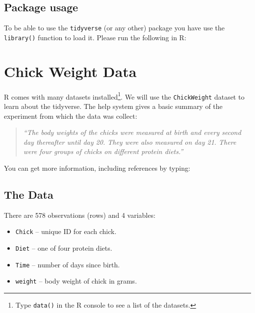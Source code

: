 \documentclass[a4paper,9pt,twocolumn,twoside,printwatermark=false]{pinp}
\providecommand{\tightlist}{%
  \setlength{\itemsep}{0pt}\setlength{\parskip}{0pt}}
\begin{document}
\subsection{Package usage}\label{package-usage}

To be able to use the \texttt{tidyverse} (or any other) package you have
use the \texttt{library()} function to load it. Please run the following
in R:

\begin{Shaded}
\begin{Highlighting}[]
\end{Highlighting}
\end{Shaded}

\section{Chick Weight Data}\label{chick-weight-data}

R comes with many datasets installed\footnote{Type \texttt{data()} in
  the R console to see a list of the datasets.}. We will use the
\texttt{ChickWeight} dataset to learn about the tidyverse. The help
system gives a basic summary of the experiment from which the data was
collect:

\begin{quote}
\emph{``The body weights of the chicks were measured at birth and every
second day thereafter until day 20. They were also measured on day 21.
There were four groups of chicks on different protein diets.''}
\end{quote}

You can get more information, including references by typing:

\begin{Shaded}
\begin{Highlighting}[]
\NormalTok{(}\NormalTok{)}
\end{Highlighting}
\end{Shaded}

\subsection{The Data}\label{the-data}

There are 578 observations (rows) and 4 variables:

\begin{itemize}
\tightlist
\item
  \texttt{Chick} -- unique ID for each chick.
\item
  \texttt{Diet} -- one of four protein diets.
\item
  \texttt{Time} -- number of days since birth.
\item
  \texttt{weight} -- body weight of chick in grams.
\end{itemize}
\end{document}
